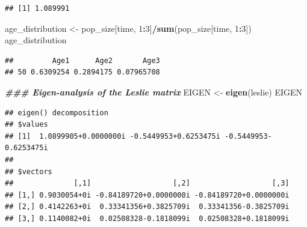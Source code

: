\documentclass[
]{book}
\newenvironment{Shaded}{\begin{snugshade}}{\end{snugshade}}
\newcommand{\CommentTok}[1]{\textcolor[rgb]{0.56,0.35,0.01}{\textit{#1}}}
\newcommand{\DecValTok}[1]{\textcolor[rgb]{0.00,0.00,0.81}{#1}}
\newcommand{\DocumentationTok}[1]{\textcolor[rgb]{0.56,0.35,0.01}{\textbf{\textit{#1}}}}
\newcommand{\FunctionTok}[1]{\textcolor[rgb]{0.13,0.29,0.53}{\textbf{#1}}}
\newcommand{\NormalTok}[1]{#1}
\newcommand{\OtherTok}[1]{\textcolor[rgb]{0.56,0.35,0.01}{#1}}
\newcommand{\SpecialCharTok}[1]{\textcolor[rgb]{0.81,0.36,0.00}{\textbf{#1}}}
\begin{document}
\begin{Shaded}
\end{Shaded}

\begin{verbatim}
## [1] 1.089991
\end{verbatim}

\begin{Shaded}
\begin{Highlighting}[]
\NormalTok{age\_distribution }\OtherTok{\textless{}{-}}\NormalTok{ pop\_size[time, }\DecValTok{1}\SpecialCharTok{:}\DecValTok{3}\NormalTok{]}\SpecialCharTok{/}\FunctionTok{sum}\NormalTok{(pop\_size[time, }\DecValTok{1}\SpecialCharTok{:}\DecValTok{3}\NormalTok{])}
\NormalTok{age\_distribution}
\end{Highlighting}
\end{Shaded}

\begin{verbatim}
##         Age1      Age2       Age3
## 50 0.6309254 0.2894175 0.07965708
\end{verbatim}

\begin{Shaded}
\begin{Highlighting}[]
\DocumentationTok{\#\#\# Eigen{-}analysis of the Leslie matrix}
\NormalTok{EIGEN }\OtherTok{\textless{}{-}} \FunctionTok{eigen}\NormalTok{(leslie)}
\NormalTok{EIGEN}
\end{Highlighting}
\end{Shaded}

\begin{verbatim}
## eigen() decomposition
## $values
## [1]  1.0899905+0.0000000i -0.5449953+0.6253475i -0.5449953-0.6253475i
## 
## $vectors
##              [,1]                   [,2]                   [,3]
## [1,] 0.9030054+0i -0.84189720+0.0000000i -0.84189720+0.0000000i
## [2,] 0.4142263+0i  0.33341356+0.3825709i  0.33341356-0.3825709i
## [3,] 0.1140082+0i  0.02508328-0.1818099i  0.02508328+0.1818099i
\end{verbatim}

\begin{Shaded}
\end{Shaded}
\end{document}
